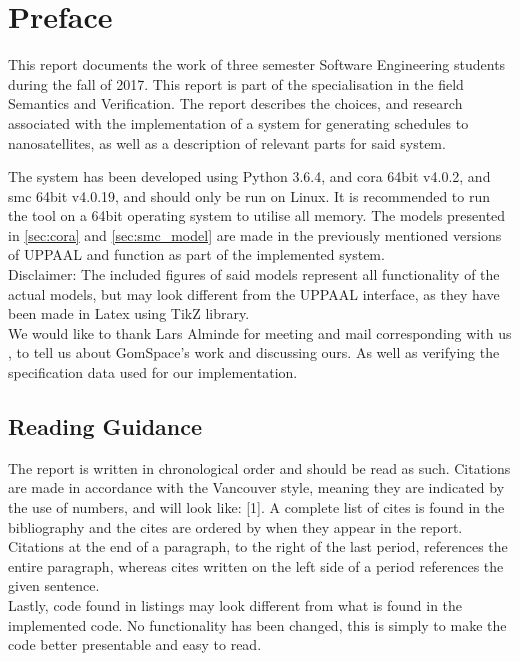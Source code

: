 \chapter*{Preface}
This report documents the work of three  semester Software Engineering students during the fall of 2017.
This report is part of the specialisation in the field Semantics and Verification. The report describes the choices, and research associated with the implementation of a system for generating schedules to nanosatellites, as well as a description of relevant parts for said system.

The system has been developed using Python 3.6.4, and \acrshort{cora} 64bit v4.0.2, and \acrshort{smc} 64bit v4.0.19, and should only be run on Linux. It is recommended to run the tool on a 64bit operating system to utilise all memory. The models presented in \cref{sec:cora}  and \cref{sec:smc_model}  are made in the previously mentioned versions of UPPAAL and function as part of the implemented system. \\
Disclaimer: The included figures of said models represent all functionality of the actual models, but may look different from the UPPAAL interface, as they have been made in Latex using TikZ library.\\

We would like to thank Lars Alminde for meeting and mail corresponding with us , to tell us about GomSpace's work and discussing ours. As well as verifying the specification data used for our implementation.

\section*{Reading Guidance}
The report is written in chronological order and should be read as such. Citations are made in accordance with the Vancouver style, meaning they are indicated by the use of numbers, and will look like: [1]. A complete list of cites is found in the bibliography and the cites are ordered by when they appear in the report. 
Citations at the end of a paragraph, to the right of the last period, references the entire paragraph, whereas cites written on the left side of a period references the given sentence.\\
Lastly, code found in listings may look different from what is found in the implemented code. No functionality has been changed, this is simply to make the code better presentable and easy to read.